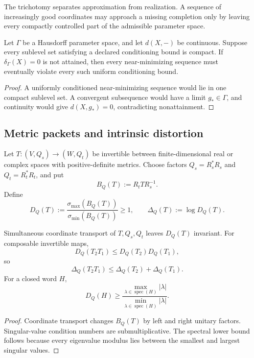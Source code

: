 The trichotomy separates approximation from realization.  A sequence of increasingly good coordinates may approach a missing completion only by leaving every compactly controlled part of the admissible parameter space.

\begin{proposition}
\label{prop:block19-escape-compactness}
Let \(\Gamma\) be a Hausdorff parameter space, and let \(d(X,-)\) be continuous.  Suppose every sublevel set satisfying a declared conditioning bound is compact.  If \(\delta_\Gamma(X)=0\) is not attained, then every near-minimizing sequence must eventually violate every such uniform conditioning bound.
\end{proposition}

\begin{proof}
A uniformly conditioned near-minimizing sequence would lie in one compact sublevel set.  A convergent subsequence would have a limit \(g_*\in\Gamma\), and continuity would give \(d(X,g_*)=0\), contradicting nonattainment.
\end{proof}

\subsection{Metric packets and intrinsic distortion}
\label{subsec:block19-metric-distortion}

Let \(T:(V,Q_s)\to(W,Q_t)\) be invertible between finite-dimensional real or complex spaces with positive-definite metrics.  Choose factors \(Q_s=R_s^*R_s\) and \(Q_t=R_t^*R_t\), and put
\[
 B_Q(T):=R_tTR_s^{-1}.
\]
Define
\[
 D_Q(T)
 :=
 \frac{\sigma_{\max}(B_Q(T))}{\sigma_{\min}(B_Q(T))}
 \geq1,
 \qquad
 \Delta_Q(T):=\log D_Q(T).
\]

\begin{proposition}
\label{prop:block19-distortion-cocycle}
Simultaneous coordinate transport of \(T,Q_s,Q_t\) leaves \(D_Q(T)\) invariant.  For composable invertible maps,
\[
 D_Q(T_2T_1)
 \leq
 D_Q(T_2)D_Q(T_1),
\]
so
\[
 \Delta_Q(T_2T_1)
 \leq
 \Delta_Q(T_2)+\Delta_Q(T_1).
\]
For a closed word \(H\),
\[
 D_Q(H)
 \geq
 \frac{\max_{\lambda\in\operatorname{spec}(H)}|\lambda|}
      {\min_{\lambda\in\operatorname{spec}(H)}|\lambda|}.
\]
\end{proposition}

\begin{proof}
Coordinate transport changes \(B_Q(T)\) by left and right unitary factors.  Singular-value condition numbers are submultiplicative.  The spectral lower bound follows because every eigenvalue modulus lies between the smallest and largest singular values.
\end{proof}

